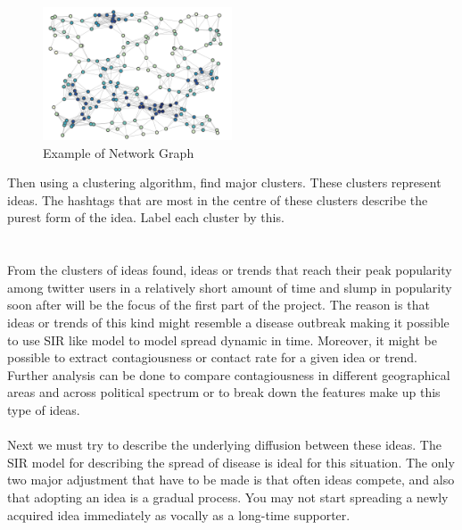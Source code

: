 \documentclass[11pt]{article}
\theoremstyle{plain}
\theoremstyle{definition}
\begin{document}
\begin{figure}[h]
\caption{Example of Network Graph}
\centering
\includegraphics[width=0.5\textwidth]{network_graph}
\end{figure}
Then using a clustering algorithm, find major clusters. These clusters represent ideas. The hashtags that are most in the centre of these clusters describe the purest form of the idea. Label each cluster by this.\\
\\ 
\\ From the clusters of ideas found, ideas or trends that reach their peak popularity among twitter users in a relatively short amount of time and slump in popularity soon after will be the focus of the first part of the project. The reason is that ideas or trends of this kind might resemble a disease outbreak making it possible to use SIR like model to model spread dynamic in time. Moreover, it might be possible to extract contagiousness or contact rate for a given idea or trend. Further analysis can be done to compare contagiousness in different geographical areas and across political spectrum or to break down the features make up this type of ideas.
\\\\
Next we must try to describe the underlying diffusion between these ideas. The SIR model for describing the spread of disease is ideal for this situation. The only two major adjustment that have to be made is that often ideas compete, and also that adopting an idea is a gradual process. You may not start spreading a newly acquired idea immediately as vocally as a long-time supporter. 






\end{document}
